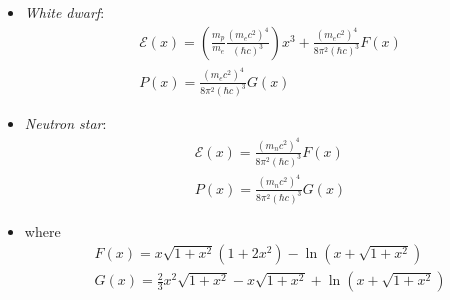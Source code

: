 \documentclass{beamer}
\begin{document}
\begin{frame}
\begin{itemize}
    \item \textit{White dwarf}:
    \begin{equation*}
        \begin{split}
            &\mathcal{E}(x) = \left(\frac{m_p}{m_e}\frac{(m_ec^2)^4}{(\hbar c)^3}\right)x^3 + \frac{(m_ec^2)^4}{8\pi^2(\hbar c)^3}F(x) \\ 
            &P(x) = \frac{(m_ec^2)^4}{8\pi^2(\hbar c)^3}G(x)
        \end{split}
    \end{equation*}
    \item \textit{Neutron star}:
    \begin{equation*}
        \begin{split}
            &\mathcal{E}(x) = \frac{(m_nc^2)^4}{8\pi^2(\hbar c)^3}F(x) \\ 
            &P(x) = \frac{(m_nc^2)^4}{8\pi^2(\hbar c)^3}G(x)
        \end{split}
    \end{equation*}
    \item[] where
    \begin{equation*}
        \begin{split}
        &F(x) = x\sqrt{1+x^2}(1+2x^2)-\ln\left(x+\sqrt{1+x^2}\right) \\ 
        &G(x) = \frac{2}{3}x^2\sqrt{1+x^2}-x\sqrt{1+x^2}+\ln\left(x+\sqrt{1+x^2}\right) \\ 
        \end{split}
    \end{equation*}
\end{itemize}
\end{frame}
\end{document}
